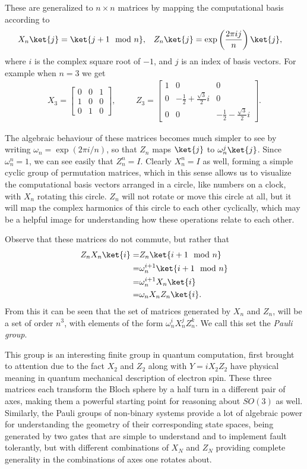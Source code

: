 These are generalized to $n\times n$ matrices by mapping the computational basis according to
\begin{align*}
X_n\ket{j} = \ket{j+1\mod n},
&&&
Z_n\ket{j} = \exp\left(\frac{2\pi ij}{n}\right)\ket{j},
\end{align*} where $i$ is the complex square root of $-1$, and $j$ is an index of basis vectors. For example when $n = 3$ we get
\begin{align*}
X_3 = \begin{bmatrix}
0 & 0 & 1 \\
1 & 0 & 0 \\
0 & 1 & 0
\end{bmatrix},
&&&
Z_3 = \begin{bmatrix}
1 & 0 & 0 \\
0 & -\frac{1}{2} + \frac{\sqrt{3}}{2}i & 0 \\
0 & 0 & -\frac{1}{2} - \frac{\sqrt{3}}{2}i
\end{bmatrix}.
\end{align*}

The algebraic behaviour of these matrices becomes much simpler to see by writing $\omega_n = \exp(2\pi i/n)$, so that $Z_n$ maps $\ket{j}$ to $\omega_n^j\ket{j}$. Since $\omega_n^n = 1$, we can see easily that $Z_n^n = I$. Clearly $X_n^n = I$ as well, forming a simple cyclic group of permutation matrices, which in this sense allows us to visualize the computational basis vectors arranged in a circle, like numbers on a clock, with $X_n$ rotating this circle. $Z_n$ will not rotate or move this circle at all, but it will map the complex harmonics of this circle to each other cyclically, which may be a helpful image for understanding how these operations relate to each other.

Observe that these matrices do not commute, but rather that
\begin{align*}
	Z_nX_n\ket{i}
	=& Z_n\ket{i+1\mod n}
	\\=& \omega_n^{i+1}\ket{i+1\mod n}
	\\=& \omega_n^{i+1}X_n\ket{i}
	\\=& \omega_nX_nZ_n\ket{i}.
\end{align*}
From this it can be seen that the set of matrices generated by $X_n$ and $Z_n$, will be a set of order $n^3$, with elements of the form $\omega_n^iX_n^jZ_n^k$. We call this set the \emph{Pauli group}.

This group is an interesting finite group in quantum computation, first brought to attention due to the fact $X_2$ and $Z_2$ along with $Y = iX_2Z_2$ have physical meaning in quantum mechanical description of electron spin. These three matrices each transform the Bloch sphere by a half turn in a different pair of axes, making them a powerful starting point for reasoning about $SO(3)$ as well. Similarly, the Pauli groups of non-binary systems provide a lot of algebraic power for understanding the geometry of their corresponding state spaces, being generated by two gates that are simple to understand and to implement fault tolerantly, but with different combinations of $X_N$ and $Z_N$ providing complete generality in the combinations of axes one rotates about.

